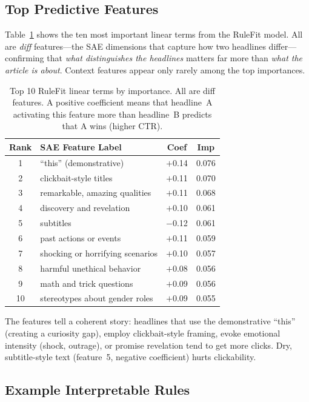 \documentclass[sigconf,natbib=false, language=english]{acmart}
\begin{document}
\subsection{Top Predictive Features}

Table~\ref{tab:top_features} shows the ten most important linear terms from the RuleFit model. All are \emph{diff} features---the SAE dimensions that capture how two headlines differ---confirming that \emph{what distinguishes the headlines} matters far more than \emph{what the article is about}. Context features appear only rarely among the top importances.

\begin{table}[t]
\centering
\caption{Top 10 RuleFit linear terms by importance. All are diff features. A positive coefficient means that headline~A activating this feature more than headline~B predicts that A wins (higher CTR).}
\label{tab:top_features}
\begin{tabular}{@{}clcc@{}}
\toprule
Rank & SAE Feature Label & Coef & Imp \\
\midrule
1 & ``this'' (demonstrative) & $+$0.14 & 0.076 \\
2 & clickbait-style titles & $+$0.11 & 0.070 \\
3 & remarkable, amazing qualities & $+$0.11 & 0.068 \\
4 & discovery and revelation & $+$0.10 & 0.061 \\
5 & subtitles & $-$0.12 & 0.061 \\
6 & past actions or events & $+$0.11 & 0.059 \\
7 & shocking or horrifying scenarios & $+$0.10 & 0.057 \\
8 & harmful unethical behavior & $+$0.08 & 0.056 \\
9 & math and trick questions & $+$0.09 & 0.056 \\
10 & stereotypes about gender roles & $+$0.09 & 0.055 \\
\bottomrule
\end{tabular}
\end{table}

The features tell a coherent story: headlines that use the demonstrative ``this'' (creating a curiosity gap), employ clickbait-style framing, evoke emotional intensity (shock, outrage), or promise revelation tend to get more clicks. Dry, subtitle-style text (feature~5, negative coefficient) hurts clickability.

\subsection{Example Interpretable Rules}
\end{document}
